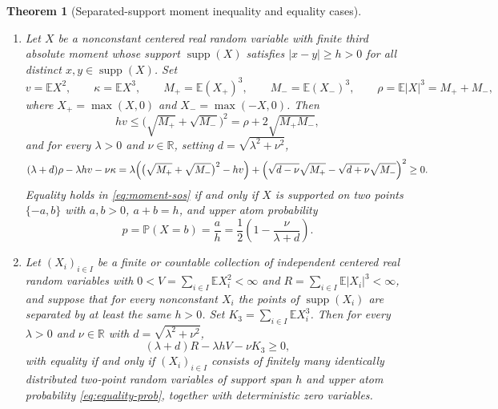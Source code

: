 \documentclass[11pt]{article}
\numberwithin{equation}{section}
\newtheorem{theorem}{Theorem}[section]
\theoremstyle{definition}
\theoremstyle{remark}
\DeclareMathOperator{\supp}{supp}
\newcommand{\E}{\mathbb E}
\newcommand{\Pp}{\mathbb P}
\newcommand{\R}{\mathbb R}
\begin{document}
\begin{theorem}[Separated-support moment inequality and equality cases]\label{thm:separated-moment}
\begin{enumerate}[label=(\roman*),leftmargin=2em]
\item\label{it:one-law-moment} Let $X$ be a nonconstant centered real random
variable with finite third absolute moment whose support $\supp(X)$ satisfies
$|x-y|\ge h>0$ for all distinct $x,y\in\supp(X)$. Set
\[
 v=\E X^2,\qquad
 \kappa=\E X^3,\qquad
 M_+=\E(X_+)^3,\qquad
 M_-=\E(X_-)^3,\qquad
 \rho=\E|X|^3=M_++M_-,
\]
where $X_+=\max(X,0)$ and $X_-=\max(-X,0)$. Then
\begin{equation}\label{eq:geometric-gap-bound}
 hv\le\bigl(\sqrt{M_+}+\sqrt{M_-}\bigr)^2=\rho+2\sqrt{M_+M_-},
\end{equation}
and for every $\lambda>0$ and $\nu\in\R$, setting $d=\sqrt{\lambda^2+\nu^2}$,
\begin{equation}\label{eq:moment-sos}
 (\lambda+d)\rho-\lambda hv-\nu\kappa
 =\lambda\Bigl(\bigl(\sqrt{M_+}+\sqrt{M_-}\bigr)^2-hv\Bigr)
 +\Bigl(\sqrt{d-\nu}\sqrt{M_+}-\sqrt{d+\nu}\sqrt{M_-}\Bigr)^2\ge0.
\end{equation}
Equality holds in \eqref{eq:moment-sos} if and only if $X$ is supported on
two points $\{-a,b\}$ with $a,b>0$, $a+b=h$, and upper atom probability
\begin{equation}\label{eq:equality-prob}
 p=\Pp(X=b)=\frac{a}{h}=\frac12\left(1-\frac{\nu}{\lambda+d}\right).
\end{equation}

\item\label{it:array-moment} Let $(X_i)_{i\in I}$ be a finite or countable
collection of independent centered real random variables with
$0<V=\sum_{i\in I}\E X_i^2<\infty$ and $R=\sum_{i\in I}\E|X_i|^3<\infty$, and
suppose that for every nonconstant $X_i$ the points of $\supp(X_i)$ are
separated by at least the same $h>0$. Set $K_3=\sum_{i\in I}\E X_i^3$. Then
for every $\lambda>0$ and $\nu\in\R$ with $d=\sqrt{\lambda^2+\nu^2}$,
\begin{equation}\label{eq:array-moment-ineq}
 (\lambda+d)R-\lambda hV-\nu K_3\ge0,
\end{equation}
with equality if and only if $(X_i)_{i\in I}$ consists of finitely many
identically distributed two-point random variables of support span $h$ and
upper atom probability \eqref{eq:equality-prob}, together with deterministic
zero variables.
\end{enumerate}
\end{theorem}
\end{document}
